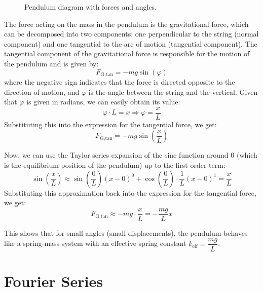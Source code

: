 \begin{figure}
    \caption{Pendulum diagram with forces and angles.}
    \label{fig:pendulum}
\end{figure}

The force acting on the mass in the pendulum is the gravitational force, which can be decomposed into two components: one perpendicular to the string (normal component) and one tangential to the arc of motion (tangential component). The tangential component of the gravitational force is responsible for the motion of the pendulum and is given by:
\[
    F_{\text{G,tan}} = - mg \sin(\varphi)
\]
where the negative sign indicates that the force is directed opposite to the direction of motion, and $\varphi$ is the angle between the string and the vertical. Given that $\varphi$ is given in radians, we can easily obtain its value:
\[
    \varphi\cdot L = x \Longrightarrow \varphi = \frac{x}{L}
\]
Substituting this into the expression for the tangential force, we get:
\[
    F_{\text{G,tan}} = - mg \sin\left(\frac{x}{L}\right)
\]

Now, we can use the Taylor series expansion of the sine function around $0$ (which is the equilibrium position of the pendulum) up to the first order term:
\[
    \sin\left(\frac{x}{L}\right) \approx \sin\left(\dfrac{0}{L}\right)(x - 0)^0 + \cos\left(\dfrac{0}{L}\right)\cdot \dfrac{1}{L}(x - 0)^1 = \dfrac{x}{L}
\]
Substituting this approximation back into the expression for the tangential force, we get:
\[
    F_{\text{G,tan}} \approx - mg \cdot \dfrac{x}{L} = - \dfrac{mg}{L} x
\]

This shows that for small angles (small displacements), the pendulum behaves like a spring-mass system with an effective spring constant $k_{\text{eff}} = \dfrac{mg}{L}$.

\section{Fourier Series}

